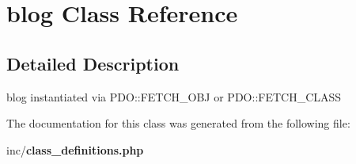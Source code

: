 \section{blog Class Reference}
\label{classblog}


\subsection{Detailed Description}
blog instantiated via P\+D\+O\+::\+F\+E\+T\+C\+H\+\_\+\+O\+BJ or P\+D\+O\+::\+F\+E\+T\+C\+H\+\_\+\+C\+L\+A\+SS 

The documentation for this class was generated from the following file\+:\begin{DoxyCompactItemize}
\item 
inc/{\bf class\+\_\+definitions.\+php}\end{DoxyCompactItemize}
